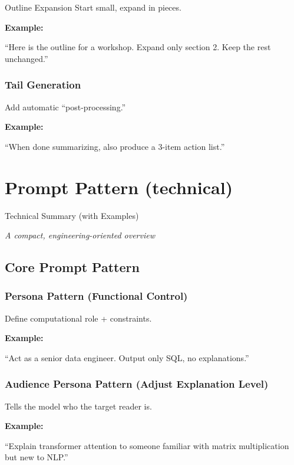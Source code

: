 \documentclass[
  letterpaper,
  DIV=11,
  numbers=noendperiod]{scrreprt}
\begin{document}
Outline Expansion Start small, expand in pieces.

\textbf{Example:}

``Here is the outline for a workshop. Expand only section 2. Keep the
rest unchanged.''

\subsection{Tail Generation}\label{tail-generation}

Add automatic ``post-processing.''

\textbf{Example:}

``When done summarizing, also produce a 3-item action list.''


\chapter{Prompt Pattern (technical)}\label{prompt-pattern-technical}

Technical Summary (with Examples)

\hfill\break

\emph{A compact, engineering-oriented overview}

\section{Core Prompt Pattern}\label{core-prompt-pattern}

\subsection{Persona Pattern (Functional
Control)}\label{persona-pattern-functional-control}

Define computational role + constraints.

\textbf{Example:}

``Act as a senior data engineer. Output only SQL, no explanations.''

\subsection{Audience Persona Pattern (Adjust Explanation
Level)}\label{audience-persona-pattern-adjust-explanation-level}

Tells the model who the target reader is.

\textbf{Example:}

``Explain transformer attention to someone familiar with matrix
multiplication but new to NLP.''
\end{document}

